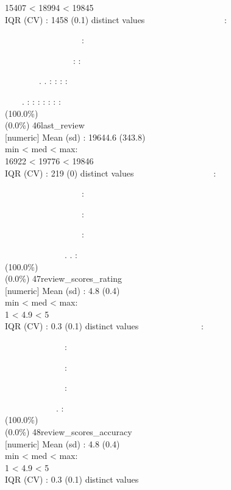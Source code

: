 \documentclass[
  journal,
]{IEEEtran}%
\begin{document}
15407 \textless{} 18994 \textless{} 19845\\
IQR (CV) : 1458 (0.1)  distinct values \textbar{}
\textbar~~~~~~~~~~~~~~~~~~:\\
\strut ~~~~~~~~~~~~~~~~~~:\\
\strut ~~~~~~~~~~~~~~~~: :\\
\strut ~~~~~~~~. . : : : :\\
\strut ~~~~. : : : : : : : \\
(100.0\%) \\
(0.0\%) \textbar{} \textbar{} 46\textbar last\_review\\
{[}numeric{]} \textbar Mean (sd) : 19644.6 (343.8)\\
min \textless{} med \textless{} max:\\
16922 \textless{} 19776 \textless{} 19846\\
IQR (CV) : 219 (0)  distinct values \textbar{}
\textbar~~~~~~~~~~~~~~~~~~:\\
\strut ~~~~~~~~~~~~~~~~~~:\\
\strut ~~~~~~~~~~~~~~~~~~:\\
\strut ~~~~~~~~~~~~~~~~~~:\\
\strut ~~~~~~~~~~~~~~. . : \\
(100.0\%) \\
(0.0\%) \textbar{} \textbar{} 47\textbar review\_scores\_rating\\
{[}numeric{]} \textbar Mean (sd) : 4.8 (0.4)\\
min \textless{} med \textless{} max:\\
1 \textless{} 4.9 \textless{} 5\\
IQR (CV) : 0.3 (0.1)  distinct values \textbar{}
\textbar~~~~~~~~~~~~~~:\\
\strut ~~~~~~~~~~~~~~:\\
\strut ~~~~~~~~~~~~~~:\\
\strut ~~~~~~~~~~~~~~:\\
\strut ~~~~~~~~~~~~. : \\
(100.0\%) \\
(0.0\%) \textbar{} \textbar{} 48\textbar review\_scores\_accuracy\\
{[}numeric{]} \textbar Mean (sd) : 4.8 (0.4)\\
min \textless{} med \textless{} max:\\
1 \textless{} 4.9 \textless{} 5\\
IQR (CV) : 0.3 (0.1)  distinct values \textbar{}
\end{document}
